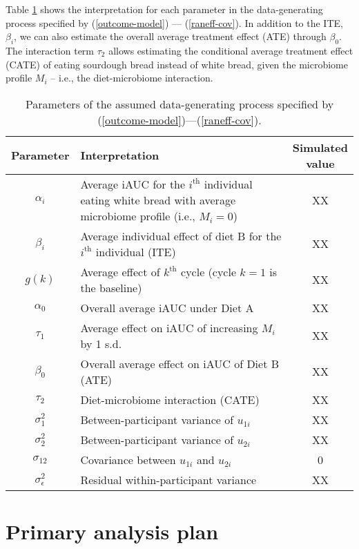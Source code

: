 \documentclass[12pt]{article}
\begin{document}
Table \ref{tab:parameters} shows the interpretation for each parameter in the data-generating process specified by (\ref{outcome-model}) --- (\ref{raneff-cov}). In addition to the ITE, $\beta_i$, we can also estimate the overall average treatment effect (ATE) through $\beta_0$. The interaction term $\tau_2$ allows estimating the conditional average treatment effect (CATE) of eating sourdough bread instead of white bread, given the microbiome profile $M_i$ -- i.e., the diet-microbiome interaction.
\newpage
\begin{table}[ht]
    \centering
    \caption{Parameters of the assumed data-generating process specified by (\ref{outcome-model})---(\ref{raneff-cov}).}
    \begin{tabular}{c p{12cm} c}
    \toprule
        \bf Parameter & \bf Interpretation & \bf \makecell{Simulated\\[1pt]value}\\
    \midrule
        $\alpha_i$ & Average iAUC for the $i^{\textrm{th}}$ individual eating white bread  with average microbiome profile (i.e., $M_i=0$)& XX\\[20pt]
        $\beta_i$ & Average individual effect of diet B for the $i^{\textrm{th}}$ individual (ITE) & XX\\
        $g(k)$ & Average effect of $k^{\textrm{th}}$ cycle (cycle $k=1$ is the baseline) & XX\\
        $\alpha_0$ & Overall average iAUC under Diet A& XX\\
        $\tau_1$ & Average effect on iAUC of increasing $M_i$ by 1 s.d.& XX\\
        $\beta_0$ & Overall average effect on iAUC of Diet B (ATE)& XX\\
        $\tau_2$ & Diet-microbiome interaction (CATE)& XX\\
        $\sigma_1^2$ & Between-participant variance of $u_{1i}$ & XX\\
        $\sigma_2^2$ & Between-participant variance of $u_{2i}$ & XX\\
        $\sigma_{12}$ & Covariance between $u_{1i}$ and $u_{2i}$ & 0\\
        $\sigma_{\epsilon}^2$ & Residual within-participant variance & XX\\
    \bottomrule
    \end{tabular}
    \label{tab:parameters}
\end{table}
\newpage

\section{Primary analysis plan}
\end{document}
